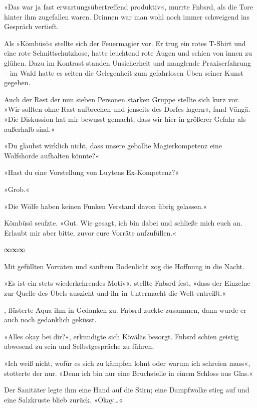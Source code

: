 »Das war ja fast erwartungsübertreffend produktiv«, murrte Fnbsrd, als die Tore hinter ihm zugefallen waren. Drinnen war man wohl noch immer schweigend ins Gespräch vertieft.

Als »Kömbüsö« stellte sich der Feuermagier vor. Er trug ein rotes T-Shirt und eine rote Schnittschutzhose, hatte leuchtend rote Augen und schien von innen zu glühen. Dazu im Kontrast standen Unsicherheit und manglende Praxiserfahrung – im Wald hatte es selten die Gelegenheit zum gefahrlosen Üben seiner Kunst gegeben.

Auch der Rest der nun sieben Personen starken Gruppe stellte sich kurz vor. »Wir sollten ohne Rast aufbrechen und jenseits des Dorfes lagern«, fand Vängä. »Die Diskussion hat mir bewusst gemacht, dass wir hier in größerer Gefahr als außerhalb sind.«

»Du glaubst wirklich nicht, dass unsere geballte Magierkompetenz eine Wolfshorde aufhalten könnte?«

»Hast du eine Vorstellung von Luytens Ex-Kompetenz?«

»Grob.«

»Die Wölfe haben keinen Funken Verstand davon übrig gelassen.«

Kömbüsö seufzte. »Gut. Wie gesagt, ich bin dabei und schließe mich euch an. Erlaubt mir aber bitte, zuvor eure Vorräte aufzufüllen.«

\begin{center}
∞∞∞
\end{center}

Mit gefüllten Vorräten und sanftem Bodenlicht zog die Hoffnung in die Nacht.

»Es ist ein stets wiederkehrendes Motiv«, stellte Fnbsrd fest, »dass der Einzelne zur Quelle des Übels auszieht und ihr in Untermacht die Welt entreißt.«

, flüsterte Aqua ihm in Gedanken zu. Fnbsrd zuckte zusammen, dann wurde er auch noch gedanklich geküsst.

»Alles okay bei dir?«, erkundigte sich Köväläs besorgt. Fnbsrd schien geistig abwesend zu sein und Selbstgespräche zu führen.

»Ich weiß nicht, wofür es sich zu kämpfen lohnt oder warum ich schreien muss«, stotterte der nur. »Denn ich bin nur eine Bruchstelle in einem Schloss aus Glas.«

Der Sanitäter legte ihm eine Hand auf die Stirn; eine Dampfwolke stieg auf und eine Salzkruste blieb zurück. »Okay…«

